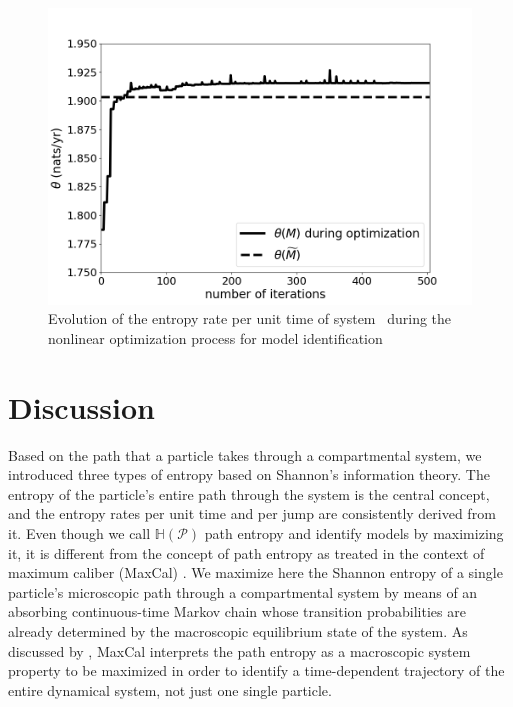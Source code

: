 \documentclass[smallextended]{svjour3}
\makeatletter
\renewcommand*{\eqref}[1]{%
  \hyperref[{#1}]{\textup{\tagform@{\ref*{#1}}}}%
}
\renewcommand{\H}{\mathbb{H}}
\makeatother
\begin{document}
	\begin{figure}[ht]
    \centering
    \includegraphics[width=0.95\linewidth]{figs/optimization.png}
		\caption{
		Evolution of the entropy rate per unit time of system~\eqref{eqn:opt_example} during the nonlinear optimization process for model identification
		}
		\label{fig:optimization}
  \end{figure}



\section{Discussion}
Based on the path that a particle takes through a compartmental system, we introduced three types of entropy based on Shannon's information theory.
The entropy of the particle's entire path through the system is the central concept, and the entropy rates per unit time and per jump are consistently derived from it.
Even though we call $\H(\mathcal{P})$ path entropy and identify models by maximizing it, it is different from the concept of path entropy as treated in the context of maximum caliber (MaxCal) \citep{jaynes1985macroscopic}.
We maximize here the Shannon entropy of a single particle's microscopic path through a compartmental system by means of an absorbing continuous-time Markov chain whose transition probabilities are already determined by the macroscopic equilibrium state of the system.
As discussed by \citet{Presse2013RMP}, MaxCal interprets the path entropy as a macroscopic system property to be maximized in order to identify a time-dependent trajectory of the entire dynamical system, not just one single particle.
\end{document}
